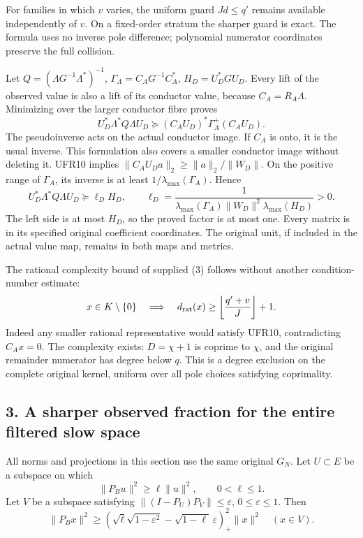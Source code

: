 \documentclass[11pt]{article}
\begin{document}
For families in which \(v\) varies, the uniform guard \(Jd\le q'\) remains available independently of \(v\). On a fixed-order stratum the sharper guard is exact. The formula uses no inverse pole difference; polynomial numerator coordinates preserve the full collision.

Let \(Q=(\Lambda G^{-1}\Lambda^*)^{-1}\), \(\Gamma_A=C_AG^{-1}C_A^*\), \(H_D=U_D^*GU_D\). Every lift of the observed value is also a lift of its conductor value, because \(C_A=R_A\Lambda\). Minimizing over the larger conductor fibre proves \[
U_D^*\Lambda^*Q\Lambda U_D
 \succeq (C_AU_D)^*\Gamma_A^+(C_AU_D).                            \tag{UFR11}
\] The pseudoinverse acts on the actual conductor image. If \(C_A\) is onto, it is the usual inverse. This formulation also covers a smaller conductor image without deleting it. UFR10 implies \(\|C_AU_Da\|_2\ge\|a\|_2/\|W_D\|\). On the positive range of \(\Gamma_A\), its inverse is at least \(1/\lambda_{\max}(\Gamma_A)\). Hence \[
U_D^*\Lambda^*Q\Lambda U_D\succeq \ell_D H_D,\qquad
\ell_D=\frac1{\lambda_{\max}(\Gamma_A)\|W_D\|^2\lambda_{\max}(H_D)}>0.
                                                                    \tag{UFR12}
\] The left side is at most \(H_D\), so the proved factor is at most one. Every matrix is in its specified original coefficient coordinates. The original unit, if included in the actual value map, remains in both maps and metrics.

The rational complexity bound of supplied (3) follows without another condition-number estimate: \[
x\in K\setminus\{0\}\quad\Longrightarrow\quad
d_{\rm rat}(x)\ge\left\lfloor\frac{q'+v}{J}\right\rfloor+1.
\] Indeed any smaller rational representative would satisfy UFR10, contradicting \(C_Ax=0\). The complexity exists: \(D=\chi+1\) is coprime to \(\chi\), and the original remainder numerator has degree below \(q\). This is a degree exclusion on the complete original kernel, uniform over all pole choices satisfying coprimality.

\subsection{3. A sharper observed fraction for the entire filtered slow space}\label{a-sharper-observed-fraction-for-the-entire-filtered-slow-space}

All norms and projections in this section use the same original \(G_N\). Let \(U\subset E\) be a subspace on which \[
\|P_Bu\|^2\ge\ell\|u\|^2,\qquad 0<\ell\le1.                     \tag{UFR13}
\] Let \(V\) be a subspace satisfying \(\|(I-P_U)P_V\|\le\varepsilon\), \(0\le\varepsilon\le1\). Then \[
\boxed{\|P_Bx\|^2\ge
\left(\sqrt\ell\sqrt{1-\varepsilon^2}
       -\sqrt{1-\ell}\,\varepsilon\right)_+^2\|x\|^2
\quad(x\in V).}                                                 \tag{UFR14}
\]
\end{document}
